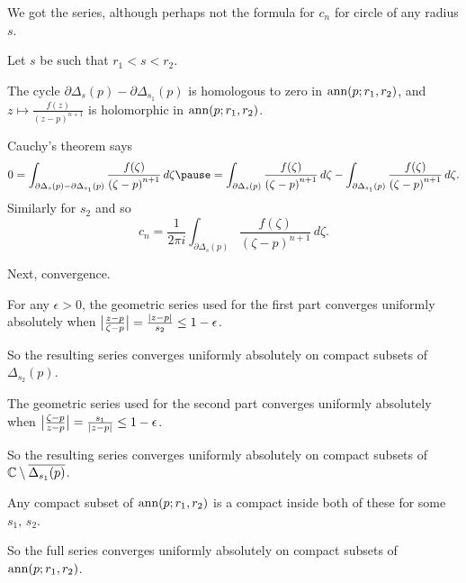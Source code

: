 \documentclass[10pt,aspectratio=169]{beamer}
\begin{document}
\begin{frame}
We got the series, although perhaps not the formula for $c_n$ for
circle of any radius $s$.

\medskip
\pause

Let $s$ be such that
$r_1 < s < r_2$.

\medskip
\pause

The cycle
$\partial \Delta_{s}(p) - \partial \Delta_{s_1}(p)$ is homologous to zero in
$\operatorname{ann}(p;r_1,r_2)$, and 
$z \mapsto \frac{f(z)}{{(z-p)}^{n+1}}$ is holomorphic in 
$\operatorname{ann}(p;r_1,r_2)$.

\medskip
\pause

Cauchy's theorem says
\[
0 = \int_{\partial \Delta_{s}(p) - \partial \Delta_{s_1}(p)}
\frac{f(\zeta)}{{(\zeta-p)}^{n+1}} \, d\zeta
\pause
=
\int_{\partial \Delta_{s}(p)}
\frac{f(\zeta)}{{(\zeta-p)}^{n+1}} \, d\zeta
-
\int_{\partial \Delta_{s_1}(p)}
\frac{f(\zeta)}{{(\zeta-p)}^{n+1}} \, d\zeta .
\]
\pause
Similarly for $s_2$ and so
\[
c_n = \frac{1}{2\pi i}
\int_{\partial \Delta_{s}(p)} \frac{f(\zeta)}{{(\zeta-p)}^{n+1}}
 \, d\zeta .
\]
\end{frame}

\begin{frame}
Next, convergence.

\medskip
\pause
For any $\epsilon > 0$,
the geometric series used for the first part converges uniformly
absolutely when $\bigl\lvert {\frac{z-p}{\zeta-p}} \bigr\rvert = \frac{\lvert {z-p} \rvert}{s_2} \leq
1-\epsilon$.

\medskip

So the resulting series converges uniformly absolutely on compact
subsets of $\Delta_{s_2}(p)$.


\medskip
\pause
The geometric series used for the second part converges uniformly
absolutely when $\bigl\lvert {\frac{\zeta-p}{z-p}} \bigr\rvert = \frac{s_1}{\lvert {z-p} \rvert} \leq
1-\epsilon$.

\medskip

So the resulting series converges uniformly absolutely on compact
subsets of ${\mathbb{C}} \setminus \overline{\Delta_{s_1}(p)}$.


\medskip
\pause

Any compact subset of $\operatorname{ann}(p;r_1,r_2)$ is a compact
inside both of these for some $s_1$, $s_2$.

\medskip
\pause

So the full series converges uniformly absolutely on compact subsets of
$\operatorname{ann}(p;r_1,r_2)$.
\end{frame}
\end{document}
